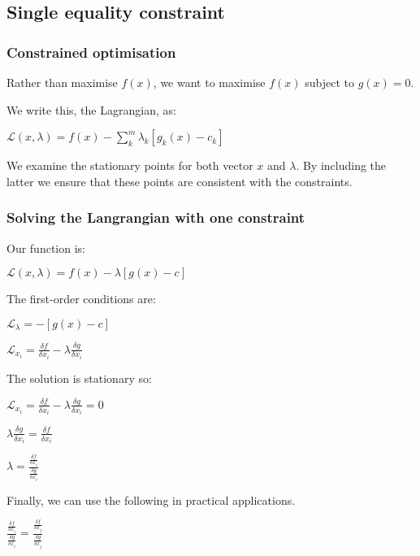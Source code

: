 
\subsection{Single equality constraint}

\subsubsection{Constrained optimisation}

Rather than maximise \(f(x)\), we want to maximise \(f(x)\) subject to \(g(x)=0\).

We write this, the Lagrangian, as:

\(\mathcal{L}(x,\lambda )=f(x)-\sum^m_k\lambda_k [g_k(x)-c_k]\)

We examine the stationary points for both vector \(x\) and \(\lambda \). By including the latter we ensure that these points are consistent with the constraints.

\subsubsection{Solving the Langrangian with one constraint}

Our function is:

\(\mathcal{L}(x, \lambda )=f(x)-\lambda [g(x)-c]\)

The first-order conditions are:

\(\mathcal{L}_{\lambda }= -[g(x)-c]\)

\(\mathcal{L}_{x_i}=\frac{\delta f}{\delta x_i}-\lambda \frac{\delta g}{\delta x_i}\)

The solution is stationary so:

\(\mathcal{L}_{x_i}=\frac{\delta f}{\delta x_i}-\lambda \frac{\delta g}{\delta x_i}=0\)

\(\lambda \frac{\delta g}{\delta x_i}=\frac{\delta f}{\delta x_i}\)

\(\lambda =\frac{\frac{\delta f}{\delta x_i}}{\frac{\delta g}{\delta x_i}}\)

Finally, we can use the following in practical applications.

\(\frac{\frac{\delta f}{\delta x_i}}{\frac{\delta g}{\delta x_i}}=\frac{\frac{\delta f}{\delta x_j}}{\frac{\delta g}{\delta x_j}}\)


